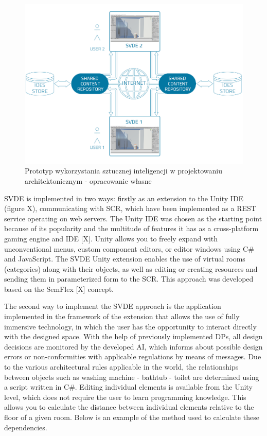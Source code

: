 \documentclass[runningheads]{llncs}
\begin{document}
\begin{figure}[H]
\centering
\includegraphics[width=\textwidth]{graf2.png}
\caption{Prototyp wykorzystania sztucznej inteligencji w projektowaniu architektonicznym - 
opracowanie własne} \label{fig2}
\end{figure}
SVDE is implemented in two ways: firstly as an extension to the Unity IDE (figure X), communicating with SCR, which have been implemented as a REST service operating on web servers. The Unity IDE was chosen as the starting point because of its popularity and the multitude of features it has as a cross-platform gaming engine and IDE
[X]. Unity allows you to freely expand with unconventional menus, custom component editors, or editor windows using C\# and JavaScript. The SVDE Unity extension enables the use of virtual rooms (categories) along with their objects, as well as editing or creating resources and sending them in parameterized form to the SCR. This approach was developed based on the SemFlex [X] concept.

The second way to implement the SVDE approach is the application implemented in the framework of the extension that allows the use of fully immersive technology, in which the user has the opportunity to interact directly with the designed space. With the help of previously implemented DPs, all design decisions are monitored by the developed AI, which informs about possible design errors or non-conformities with applicable regulations by means of messages.
Due to the various architectural rules applicable in the world, the relationships between objects such as washing machine - bathtub - toilet are determined using a script written in C\#. Editing individual elements is available from the Unity level, which does not require the user to learn programming knowledge. This allows you to calculate the distance between individual elements relative to the floor of a given room. Below is an example of the method used to calculate these dependencies. 
\end{document}

